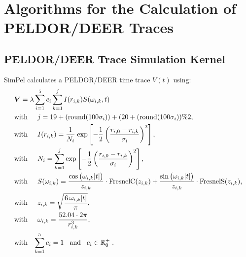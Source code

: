 \documentclass[pdftex,bezier,german,a4,twoside, headexclude,12pt,nochapterprefix, titlepage]{extarticle}
\newcommand{\simpel}{\textsf{SimPel}}
\begin{document}
\clearpage

\section{Algorithms for the Calculation of PELDOR/DEER Traces}


\subsection{PELDOR/DEER Trace Simulation Kernel}

\simpel{} calculates a PELDOR/DEER time trace $V(t)$ using:
%
\begin{align}
\begin{split}
& \boldsymbol{V}=  \lambda \sum_{i=1}^5 c_i\sum_{k=1}^{j}I(r_{i,k})S(\omega_{i,k},t) \\
&\mbox{with}\hspace{0.5cm} j =  19+(\mathrm{round}(100\sigma_i)) + (20+(\mathrm{round}(100\sigma_i))\%2,\\
&\mbox{with}\hspace{0.5cm} I(r_{i,k}) =\dfrac{1}{N_{i}} \;
\mathrm{exp}\left[-\frac{1}{2}\left(\frac{r_{i,0}-r_{i,k}}{\sigma_i}\right)^2\right],\\
&\mbox{with}\hspace{0.5cm} N_{i} = \sum_{k=1}^{j}\mathrm{exp}\left[-\frac{1}{2}\left(\frac{r_{i,0}-r_{i,k}}{\sigma_i}\right)^2\right] ,\\
&\mbox{with}\hspace{0.5cm}S(\omega_{i,k}) = 
\frac{\cos{\big(\omega_{i,k}|t| \big)}}{z_{i,k}} \cdot \text{FresnelC}(z_{i,k})  + 
   \frac{\sin{\big(\omega_{i,k} |t|\big)}}{z_{i,k}} \cdot \text{FresnelS}(z_{i,k}),\\
  &\mbox{with}\hspace{0.5cm}  z_{i,k} = \sqrt{\frac{6\,\omega_{i,k} |t| }{\pi}},\\
&\mbox{with}\hspace{0.5cm} \omega_{i,k} = \dfrac{52.04\cdot 2 \pi}{r_{i,k}^3},\\ 
&\mbox{with}\hspace{0.3cm} \sum_{k=1}^{5}c_i = 1 \hspace{0.3cm}
\mbox{and}\hspace{0.3cm}c_i \in\mathbb{R}^+_0\; .
\label{PELDOR_kernel_function}
\end{split}
\end{align}
\end{document}
